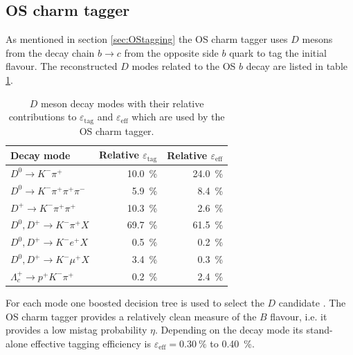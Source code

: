 \documentclass{PoS}
\begin{document}
%

\subsection{OS charm tagger}

As mentioned in section \ref{sec:OStagging} the OS charm tagger uses $D$ mesons from the decay chain $b\to c$ from the opposite side $b$ quark to tag the initial flavour. The reconstructed $D$ modes related to the OS $b$ decay are listed in table \ref{tab:OScharm}.
\begin{table}[htbp]
  \centering
  \begin{tabular}{lrr}
  \toprule
  Decay mode &Relative $\varepsilon_\text{tag}$ & Relative $\varepsilon_\text{eff}$ \\
  \midrule
  $D^0\to K^-\pi^+$ & \SI{10.0}{\%} & \SI{24.0}{\%} \\ 
  $D^0\to K^-\pi^+\pi^+\pi^-$ & \SI{5.9}{\%} & \SI{8.4}{\%} \\
  $D^+\to K^-\pi^+\pi^+$ & \SI{10.3}{\%} & \SI{2.6}{\%} \\
  $D^0,D^+\to K^-\pi^+X$ & \SI{69.7}{\%} & \SI{61.5}{\%} \\
  $D^0,D^+\to K^-e^+X$ & \SI{0.5}{\%} & \SI{0.2}{\%} \\
  $D^0,D^+\to K^-\mu^+X$ & \SI{3.4}{\%} & \SI{0.3}{\%} \\
  $\Lambda_c^+\to p^+K^-\pi^+$ & \SI{0.2}{\%} & \SI{2.4}{\%} \\
  \bottomrule
  \end{tabular}
  \small{\caption{$D$ meson decay modes with their relative contributions to $\varepsilon_\text{tag}$ and $\varepsilon_\text{eff}$ which are used by the OS charm tagger.}}
  \label{tab:OScharm}
\end{table}
For each mode one boosted decision tree is used to select the $D$ candidate \cite{12}. The OS charm tagger provides a relatively clean measure of the $B$ flavour, i.e. it provides a low mistag probability $\eta$. Depending on the decay mode its stand-alone effective tagging efficiency is $\varepsilon_\text{eff}=\SI{0.30}{\%}$ to \SI{0.40}{\%}.
\end{document}
